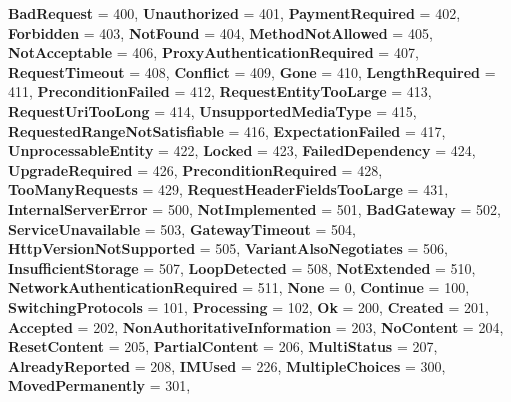 \begin{DoxyCompactItemize}
{\bfseries Bad\+Request} = 400, 
{\bfseries Unauthorized} = 401, 
{\bfseries Payment\+Required} = 402, 
{\bfseries Forbidden} = 403, 
\newline
{\bfseries Not\+Found} = 404, 
{\bfseries Method\+Not\+Allowed} = 405, 
{\bfseries Not\+Acceptable} = 406, 
{\bfseries Proxy\+Authentication\+Required} = 407, 
\newline
{\bfseries Request\+Timeout} = 408, 
{\bfseries Conflict} = 409, 
{\bfseries Gone} = 410, 
{\bfseries Length\+Required} = 411, 
\newline
{\bfseries Precondition\+Failed} = 412, 
{\bfseries Request\+Entity\+Too\+Large} = 413, 
{\bfseries Request\+Uri\+Too\+Long} = 414, 
{\bfseries Unsupported\+Media\+Type} = 415, 
\newline
{\bfseries Requested\+Range\+Not\+Satisfiable} = 416, 
{\bfseries Expectation\+Failed} = 417, 
{\bfseries Unprocessable\+Entity} = 422, 
{\bfseries Locked} = 423, 
\newline
{\bfseries Failed\+Dependency} = 424, 
{\bfseries Upgrade\+Required} = 426, 
{\bfseries Precondition\+Required} = 428, 
{\bfseries Too\+Many\+Requests} = 429, 
\newline
{\bfseries Request\+Header\+Fields\+Too\+Large} = 431, 
{\bfseries Internal\+Server\+Error} = 500, 
{\bfseries Not\+Implemented} = 501, 
{\bfseries Bad\+Gateway} = 502, 
\newline
{\bfseries Service\+Unavailable} = 503, 
{\bfseries Gateway\+Timeout} = 504, 
{\bfseries Http\+Version\+Not\+Supported} = 505, 
{\bfseries Variant\+Also\+Negotiates} = 506, 
\newline
{\bfseries Insufficient\+Storage} = 507, 
{\bfseries Loop\+Detected} = 508, 
{\bfseries Not\+Extended} = 510, 
{\bfseries Network\+Authentication\+Required} = 511, 
\newline
{\bfseries None} = 0, 
{\bfseries Continue} = 100, 
{\bfseries Switching\+Protocols} = 101, 
{\bfseries Processing} = 102, 
\newline
{\bfseries Ok} = 200, 
{\bfseries Created} = 201, 
{\bfseries Accepted} = 202, 
{\bfseries Non\+Authoritative\+Information} = 203, 
\newline
{\bfseries No\+Content} = 204, 
{\bfseries Reset\+Content} = 205, 
{\bfseries Partial\+Content} = 206, 
{\bfseries Multi\+Status} = 207, 
\newline
{\bfseries Already\+Reported} = 208, 
{\bfseries I\+M\+Used} = 226, 
{\bfseries Multiple\+Choices} = 300, 
{\bfseries Moved\+Permanently} = 301, 
\newline

\end{DoxyCompactItemize}
